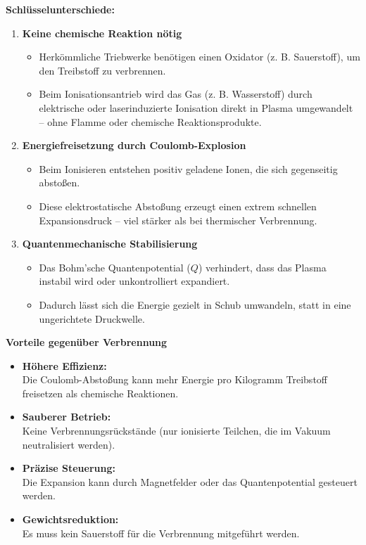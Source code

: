 \textbf{Schlüsselunterschiede:}
\begin{enumerate}
    \item \textbf{Keine chemische Reaktion nötig}
        \begin{itemize}
            \item Herkömmliche Triebwerke benötigen einen Oxidator (z. B. Sauerstoff), um den Treibstoff zu verbrennen.
            \item Beim Ionisationsantrieb wird das Gas (z. B. Wasserstoff) durch elektrische oder laserinduzierte Ionisation direkt in Plasma umgewandelt – ohne Flamme oder chemische Reaktionsprodukte.
        \end{itemize}
    \item \textbf{Energiefreisetzung durch Coulomb-Explosion}
        \begin{itemize}
            \item Beim Ionisieren entstehen positiv geladene Ionen, die sich gegenseitig abstoßen.
            \item Diese elektrostatische Abstoßung erzeugt einen extrem schnellen Expansionsdruck – viel stärker als bei thermischer Verbrennung.
        \end{itemize}
    \item \textbf{Quantenmechanische Stabilisierung}
        \begin{itemize}
            \item Das Bohm’sche Quantenpotential ($Q$) verhindert, dass das Plasma instabil wird oder unkontrolliert expandiert.
            \item Dadurch lässt sich die Energie gezielt in Schub umwandeln, statt in eine ungerichtete Druckwelle.
        \end{itemize}
\end{enumerate}

\textbf{Vorteile gegenüber Verbrennung}
\begin{itemize}
    \item \textbf{Höhere Effizienz:}\\Die Coulomb-Abstoßung kann mehr Energie pro Kilogramm Treibstoff freisetzen als chemische Reaktionen.
    \item \textbf{Sauberer Betrieb:}\\Keine Verbrennungsrückstände (nur ionisierte Teilchen, die im Vakuum neutralisiert werden).
    \item \textbf{Präzise Steuerung:}\\Die Expansion kann durch Magnetfelder oder das Quantenpotential gesteuert werden.
    \item \textbf{Gewichtsreduktion:}\\Es muss kein Sauerstoff für die Verbrennung mitgeführt werden.
\end{itemize}

